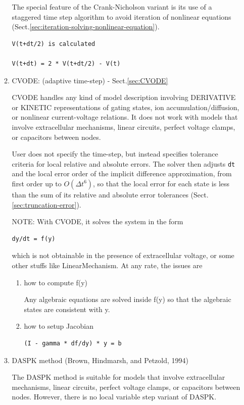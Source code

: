 \begin{enumerate}
\begin{enumerate}
The special feature of the Crank-Nicholson variant is its use of a staggered
time step algorithm to avoid iteration of nonlinear equations
(Sect.\ref{sec:iteration-solving-nonlinear-equation}).
\begin{verbatim}
V(t+dt/2) is calculated

V(t+dt) = 2 * V(t+dt/2) - V(t)
\end{verbatim}

  \item CVODE: (adaptive time-step) - Sect.\ref{sec:CVODE}
  
\label{sec:CVODE}

CVODE handles any kind of model description involving DERIVATIVE or KINETIC
representations of gating states, ion accumulation/diffusion, or nonlinear
current-voltage relations. It does not work with models that involve
extracellular mechanisms, linear circuits, perfect voltage clamps, or capacitors
between nodes.
  
User does not specify the time-step, but instead specifies tolerance criteria
for local relative and absolute errors. The solver then adjusts \verb!dt! and
the local error order of the implicit difference approximation, from first order
up to $O(\Delta t^6)$, so that the local error for each state is less than the
sum of its relative and absolute error tolerances
(Sect.\ref{sec:truncation-error}).

NOTE: With CVODE, it solves the system in the form
\begin{verbatim}
dy/dt = f(y)
\end{verbatim}
which is not obtainable in the presence of extracellular voltage, or some other
stuffs like LinearMechanism.
At any rate, the issues are
\begin{enumerate}
  \item how to compute f(y) 
  
Any algebraic equations are solved inside f(y) so that the algebraic states are
consistent with y.

  \item how to setup Jacobian 
  
\begin{verbatim}
(I - gamma * df/dy) * y = b
\end{verbatim}
\end{enumerate}

  
  \item DASPK method (Brown, Hindmarsh, and Petzold, 1994)

The DASPK method is suitable for models that involve extracellular mechanisms,
linear circuits, perfect voltage clamps, or capacitors between nodes. However,
there is no local variable step variant of DASPK.


\end{enumerate}
\end{enumerate}
